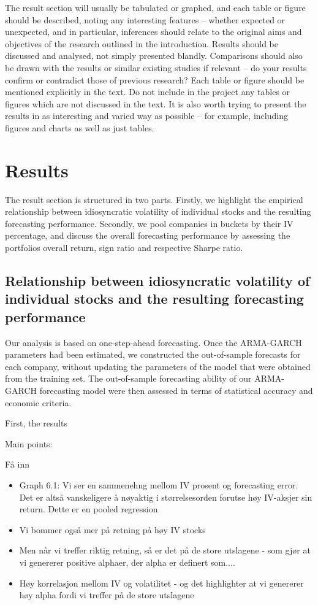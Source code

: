 The result section will usually be tabulated or graphed, and each table or figure should be described, noting any interesting features – whether expected or unexpected, and in particular, inferences should relate to the original aims and objectives of the research outlined in the introduction. Results should be discussed and analysed, not simply presented blandly. Comparisons should also be drawn with the results or similar existing studies if relevant – do your results confirm or contradict those of previous research? Each table or figure should be mentioned explicitly in the text. Do not include in the project any tables or figures which are not discussed in the text. It is also worth trying to present the results in as interesting and varied way as possible – for example, including figures and charts as well as just tables.


\chapter{Results}
The result section is structured in two parts. Firstly, we highlight the empirical relationship between idiosyncratic volatility of individual stocks and the resulting forecasting performance. Secondly, we pool companies in buckets by their IV percentage, and discuss the overall forecasting performance by assessing the portfolios overall return, sign ratio and respective Sharpe ratio.

\section*{Relationship between idiosyncratic volatility of individual stocks and the resulting forecasting performance}

Our analysis is based on one-step-ahead forecasting. Once the ARMA-GARCH parameters had been estimated, we constructed the out-of-sample forecasts for each company, without updating the parameters of the model that were
obtained from the training set. The out-of-sample forecasting ability of our ARMA-GARCH forecasting model were then assessed in terms of statistical accuracy and economic criteria. 

First, the results 


Main points:

Få inn 
\begin{itemize}
    \item Graph 6.1: Vi ser en sammenehng mellom IV prosent og forecasting error. Det er altså vanskeligere å nøyaktig i størrelsesorden forutse høy IV-aksjer sin return. Dette er en pooled regression
    \item Vi bommer også mer på retning på høy IV stocks
    \item Men når vi treffer riktig retning, så er det på de store utslagene - som gjør at vi genererer positive alphaer, der alpha er definert som....
    \item Høy korrelasjon mellom IV og volatilitet - og det highlighter at vi genererer høy alpha fordi vi treffer på de store utslagene
\end{itemize}

